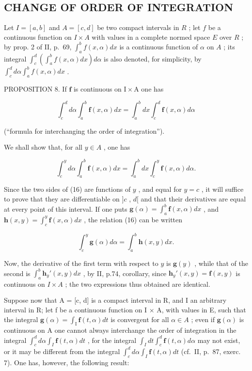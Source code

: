 \subsection{CHANGE OF ORDER OF INTEGRATION}

Let \(I = [a, b]\) and \(A = [c, d]\) be two compact intervals in \(R\) ; let \(f\) be a continuous function on \(I \times A\) with values in a complete normed space \(E\) over \(R\) ; by prop. 2 of II, p.~69, \(\int_{a}^{b} f(x, \alpha) dx\) is a continuous function of \(\alpha\) on \(A\) ; its integral \(\int_{c}^{d} \left( \int_{a}^{b} f(x, \alpha) dx \right) d\alpha\) is also denoted, for simplicity, by \(\int_{c}^{d} d\alpha \int_{a}^{b} f(x, \alpha) dx\) .

PROPOSITION 8. If \(\mathbf{f}\) is continuous on \(\mathrm{I} \times \mathrm{A}\) one has

\[
\int_ {c} ^ {d} d \alpha \int_ {a} ^ {b} \mathbf {f} (x, \alpha) d x = \int_ {a} ^ {b} d x \int_ {c} ^ {d} \mathbf {f} (x, \alpha) d \alpha\tag{15}
\]

(``formula for interchanging the order of integration'').

We shall show that, for all \(y \in A\) , one has

\[
\int_ {c} ^ {y} d \alpha \int_ {a} ^ {b} \mathbf {f} (x, \alpha) d x = \int_ {a} ^ {b} d x \int_ {c} ^ {y} \mathbf {f} (x, \alpha) d \alpha .\tag{16}
\]

Since the two sides of (16) are functions of \(y\) , and equal for \(y = c\) , it will suffice to prove that they are differentiable on \(]c\) , \(d[\) and that their derivatives are equal at every point of this interval. If one puts \(\mathbf{g}(\alpha) = \int_{a}^{b} \mathbf{f}(x, \alpha) dx\) , and \(\mathbf{h}(x, y) = \int_{c}^{y} \mathbf{f}(x, \alpha) dx\) , the relation (16) can be written

\[
\int_ {c} ^ {y} \mathbf {g} (\alpha) d \alpha = \int_ {a} ^ {b} \mathbf {h} (x, y) d x.
\]

Now, the derivative of the first term with respect to \(y\) is \(\mathbf{g}(y)\) , while that of the second is \(\int_{a}^{b} \mathbf{h}_{y}'(x, y) dx\) , by II, p.74, corollary, since \(\mathbf{h}_{y}'(x, y) = \mathbf{f}(x, y)\) is continuous on \(I \times A\) ; the two expressions thus obtained are identical.

Suppose now that A = {[}c, d{]} is a compact interval in R, and I an arbitrary interval in R; let f be a continuous function on I × A, with values in E, such that the integral \(\mathbf{g}(\alpha) = \int_{\mathrm{I}} \mathbf{f}(t, \alpha) dt\) is convergent for all \(\alpha \in A\) ; even if \(\mathbf{g}(\alpha)\) is continuous on A one cannot always interchange the order of integration in the integral \(\int_{c}^{d} d\alpha \int_{I} \mathbf{f}(t, \alpha) dt\) , for the integral \(\int_{I} dt \int_{c}^{d} \mathbf{f}(t, \alpha) d\alpha\) may not exist, or it may be different from the integral \(\int_{c}^{d} d\alpha \int_{I} \mathbf{f}(t, \alpha) dt\) (cf.~II, p.~87, exerc. 7). One has, however, the following result:

